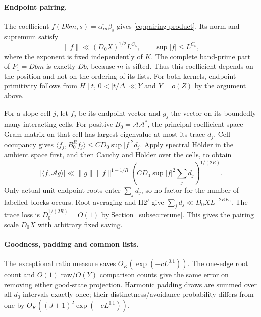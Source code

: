 \documentclass[11pt]{article}
\theoremstyle{definition}
\theoremstyle{remark}
\numberwithin{equation}{section}
\begin{document}
\paragraph{Endpoint pairing.}
The coefficient $f(Db m,s)=\overline{\alpha_m}\beta_s$ gives
\eqref{eq:pairing-product}. Its norm and supremum satisfy
\[
 \|f\|\ll(D_0X)^{1/2}L^{C_6},\qquad \sup|f|\le L^{C_6},
\]
where the exponent is fixed independently of $K$.
The complete band-prime part of $P_1=Dbm$ is exactly $Db$,
because $m$ is sifted. Thus this coefficient depends on the
position and not on the ordering of its lists. For both kernels,
endpoint primitivity follows from $H\mid t$, $0<|t/\Delta|\ll Y$
and $Y=o(Z)$ by the argument above.

For a slope cell $j$, let $f_j$ be its endpoint vector and $g_j$
the vector on its boundedly many interacting cells. For positive
$B_0=\mathcal A\mathcal A^*$, the principal coefficient-space
Gram matrix on that cell has largest eigenvalue at most its trace
$d_j$. Cell occupancy gives
$\langle f_j,B_0^Rf_j\rangle\le CD_0\sup|f|^2d_j$.
Apply spectral H\"older in the ambient space first, and then
Cauchy and H\"older over the cells, to obtain
\begin{equation}\label{eq:cell-pairing}
 |\langle f,\mathcal A g\rangle|
 \ll\|g\|\|f\|^{1-1/R}
       \left(CD_0\sup|f|^2\sum_jd_j\right)^{1/(2R)}.
\end{equation}
Only actual unit endpoint roots enter $\sum_jd_j$, so no factor
for the number of labelled blocks occurs. Root averaging and
$\mathrm H2'$ give
$\sum_jd_j\ll D_0XL^{-2RE_0}$. The trace loss is
$D_0^{1/(2R)}=O(1)$ by Section~\ref{subsec:retune}.
This gives the pairing scale $D_0X$ with arbitrary fixed saving.

\paragraph{Goodness, padding and common lists.}
The exceptional ratio measure saves
$O_K(\exp(-cL^{0.1}))$. The one-edge root count and
$O(1)$ raw/$O(Y)$ comparison counts give the same error on
removing either good-state projection. Harmonic padding draws
are summed over all $d_0$ intervals exactly once; their
distinctness/avoidance probability differs from one by
$O_K((J+1)^2\exp(-cL^{0.1}))$.
\end{document}
